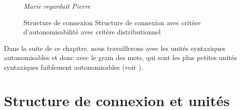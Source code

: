 \begin{figure}
\textit{Marie regardait Pierre}


Structure de connexion         Structure de connexion
           avec critère d’autonomisabilité         avec critère distributionnel
\caption{\label{fig:}}
\end{figure}

Dans la suite de ce chapitre, nous travaillerons avec les unités syntaxiques autonomisables et donc avec le grain des mots, qui sont les plus petites unités syntaxiques faiblement autonomisables (voir ).

\section{Structure de connexion et unités}\label{sec:3.2.19}

